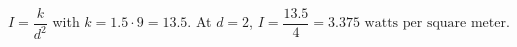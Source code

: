 $I=\dfrac{k}{d^2}$ with $k=1.5\cdot9=13.5$. At $d=2$, $I=\dfrac{13.5}{4}=\boxed{3.375\text{ watts per square meter}}$.
